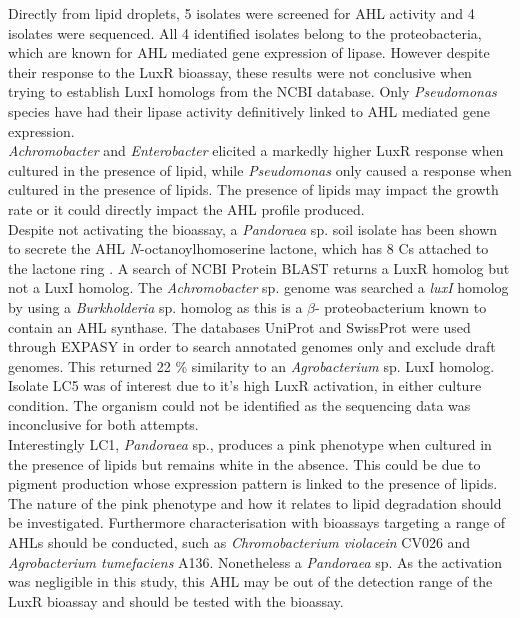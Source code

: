 \documentclass[twoside]{article}
\begin{document}
Directly from lipid droplets, 5 isolates were screened for AHL activity and 4 isolates were sequenced. All 4 identified isolates belong to the proteobacteria, which are known for AHL mediated gene expression of lipase. However despite their response to the LuxR bioassay, these results were not conclusive when trying to establish LuxI homologs from the NCBI database. Only \emph{Pseudomonas} species have had their lipase activity definitively linked to AHL mediated gene expression. \\

\emph{Achromobacter} and \emph{Enterobacter} elicited a markedly higher LuxR response when cultured in the presence of lipid, while \emph{Pseudomonas} only caused a response when cultured in the presence of lipids. The presence of lipids may impact the growth rate or it could directly impact the AHL profile produced. \\

Despite not activating the bioassay, a \emph{Pandoraea} sp. soil isolate has been shown to secrete the AHL \emph{N}-octanoylhomoserine lactone, which has 8 Cs attached to the lactone ring \cite{han2013pandoraea}. A search of NCBI Protein BLAST returns a LuxR homolog but not a LuxI homolog. The \emph{Achromobacter} sp. genome was searched a \emph{luxI} homolog by using a \emph{Burkholderia} sp. homolog as  this is a \emph{$\beta$}- proteobacterium known to contain an AHL synthase. The databases UniProt and SwissProt were used through EXPASY in order to search annotated genomes only and exclude draft genomes. This returned  22 \% similarity to an \emph{Agrobacterium} sp. LuxI homolog.\\

Isolate LC5 was of interest due to it's high LuxR activation, in either culture condition. The organism could not be identified as the sequencing data was inconclusive for both attempts.\\

Interestingly LC1, \emph{Pandoraea} sp., produces a pink phenotype when cultured in the presence of lipids but remains white in the absence. This could be due to pigment production whose expression pattern is linked to the presence of lipids. The nature of the pink phenotype and how it relates to lipid degradation should be investigated. 
Furthermore characterisation with bioassays targeting a range of AHLs should be conducted, such as \emph{Chromobacterium violacein} CV026 and \emph{Agrobacterium tumefaciens} A136.
Nonetheless a \emph{Pandoraea} sp.  As the activation was negligible in this study, this AHL may be out of the detection range of the LuxR bioassay and should be tested with the  bioassay.
\newpage
\end{document}
